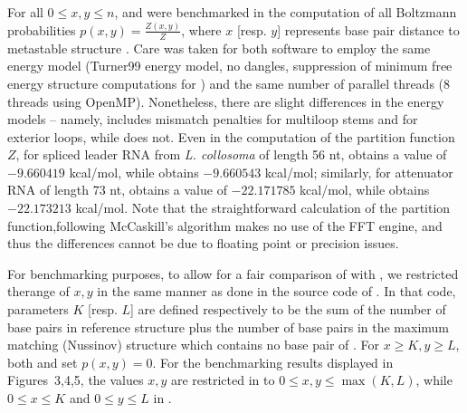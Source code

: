 For all $0 \leq x,y \leq n$, \rnatwofold and \ffttwo were
benchmarked in the computation of all Boltzmann probabilities
$p(x,y)= \frac{Z(x,y)}{Z}$, where $x$ [resp. $y$] represents base pair
distance to metastable structure . Care was taken for
both software to employ the same energy model (Turner99 energy model,
no dangles, suppression of minimum free energy structure computations
for \rnatwofold) and the same number of parallel threads (8 threads
using OpenMP). Nonetheless, there are slight differences in the energy
models -- namely, \rnatwofold includes
mismatch penalties for multiloop stems and for exterior loops, while
\ffttwo does not. Even in the computation of the partition function
$Z$, for spliced leader RNA from {\em L. collosoma} of length 56 nt,
 obtains a value of
$-9.660419$ kcal/mol, while \ffttwo obtains
$-9.660543$ kcal/mol; similarly, for attenuator RNA of length 73 nt,
 obtains a value of
$-22.171785$ kcal/mol, while \ffttwo obtains
$-22.173213$ kcal/mol.
Note that the straightforward calculation of the partition function,following McCaskill's algorithm \citep{mcCaskill}makes no use of the FFT engine, and thus the
differences cannot be due to floating point or precision issues.

For benchmarking purposes,
to allow for a fair comparison of \ffttwo
with \rnatwofold, we restricted therange of $x,y$ in the same manner as done in the source code of \rnatwofold.
In that code, parameters $K$ [resp. $L$] are defined respectively to be the
sum of the number of base pairs in reference structure  plus the number of base pairs in
the maximum matching (Nussinov) structure which contains
no base pair of .
For $x \geq K, y \geq L$, both \rnatwofold and \ffttwo
set $p(x,y)=0$.  For the benchmarking results displayed in
Figures~3,4,5, the values $x,y$ are restricted in
\ffttwo to $0 \leq x,y \leq \max(K,L)$, while $0 \leq x \leq K$
and $0 \leq y \leq L$ in \rnatwofold.

